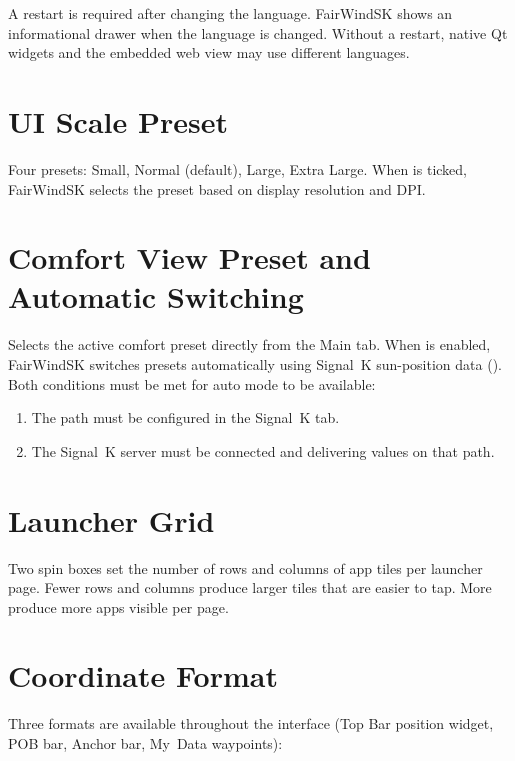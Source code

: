 \begin{warningbox}
A restart is required after changing the language.
FairWindSK shows an informational drawer when the language is changed.
Without a restart, native Qt widgets and the embedded web view may use different
languages.
\end{warningbox}

\section{UI Scale Preset}

Four presets: Small, Normal (default), Large, Extra Large.
When  is ticked, FairWindSK selects the preset based on display resolution
and DPI.

\section{Comfort View Preset and Automatic Switching}

Selects the active comfort preset directly from the Main tab.
When  is enabled, FairWindSK switches presets automatically
using Signal~K sun-position data ().
Both conditions must be met for auto mode to be available:

\begin{enumerate}
  \item The  path must be configured in the Signal~K tab.
  \item The Signal~K server must be connected and delivering values on that path.
\end{enumerate}

\section{Launcher Grid}

Two spin boxes set the number of rows and columns of app tiles per launcher page.
Fewer rows and columns produce larger tiles that are easier to tap.
More produce more apps visible per page.

\section{Coordinate Format}

Three formats are available throughout the interface (Top Bar position widget, POB bar,
Anchor bar, My~Data waypoints):

